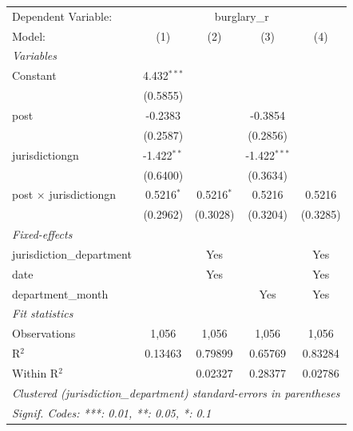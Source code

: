 \begingroup
\centering
\begin{tabular}{lcccc}
   \tabularnewline \midrule \midrule
   Dependent Variable: & \multicolumn{4}{c}{burglary\_r}\\
   Model:                        & (1)           & (2)          & (3)            & (4)\\  
   \midrule
   \emph{Variables}\\
   Constant                      & 4.432$^{***}$ &              &                &   \\   
                                 & (0.5855)      &              &                &   \\   
   post                          & -0.2383       &              & -0.3854        &   \\   
                                 & (0.2587)      &              & (0.2856)       &   \\   
   jurisdictiongn                & -1.422$^{**}$ &              & -1.422$^{***}$ &   \\   
                                 & (0.6400)      &              & (0.3634)       &   \\   
   post $\times$ jurisdictiongn  & 0.5216$^{*}$  & 0.5216$^{*}$ & 0.5216         & 0.5216\\   
                                 & (0.2962)      & (0.3028)     & (0.3204)       & (0.3285)\\   
   \midrule
   \emph{Fixed-effects}\\
   jurisdiction\_department      &               & Yes          &                & Yes\\  
   date                          &               & Yes          &                & Yes\\  
   department\_month             &               &              & Yes            & Yes\\  
   \midrule
   \emph{Fit statistics}\\
   Observations                  & 1,056         & 1,056        & 1,056          & 1,056\\  
   R$^2$                         & 0.13463       & 0.79899      & 0.65769        & 0.83284\\  
   Within R$^2$                  &               & 0.02327      & 0.28377        & 0.02786\\  
   \midrule \midrule
   \multicolumn{5}{l}{\emph{Clustered (jurisdiction\_department) standard-errors in parentheses}}\\
   \multicolumn{5}{l}{\emph{Signif. Codes: ***: 0.01, **: 0.05, *: 0.1}}\\
\end{tabular}
\par\endgroup
